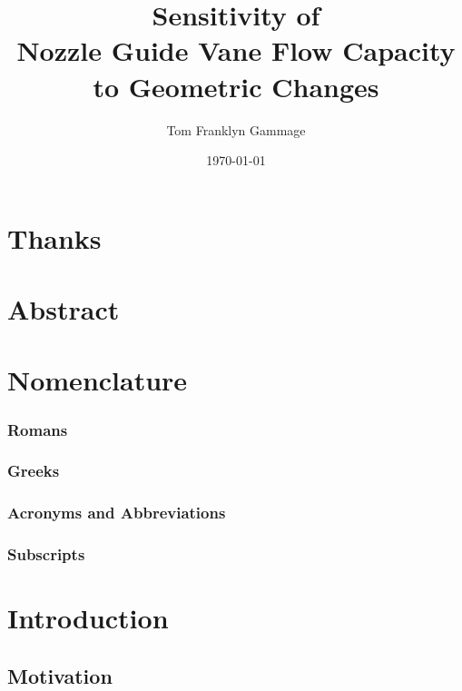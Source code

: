 \documentclass[a4paper, 11pt, twoside]{report}
\title{Sensitivity of\\Nozzle Guide Vane Flow Capacity\\to Geometric Changes}
\author{Tom Franklyn Gammage}
\date{\mydate\today}
\begin{document}
\maketitle

\chapter*{Thanks}

\chapter*{Abstract}

\tableofcontents
\listoffigures
\listoftables

\chapter*{Nomenclature}
\subsection*{Romans}
\subsection*{Greeks}
\subsection*{Acronyms and Abbreviations}
\subsection*{Subscripts}



\chapter{Introduction}



\section{Motivation}
\end{document}
